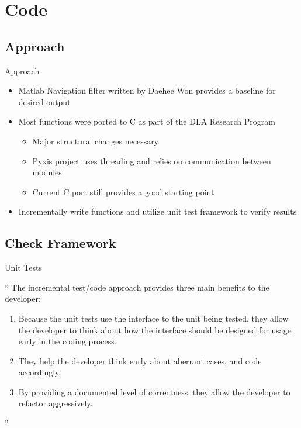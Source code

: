 \documentclass[10pt,aspectratio=169]{beamer}
\begin{document}
\section{Code}%

\subsection{Approach}
    \begin{frame}{Approach}
        \begin{itemize}
            \item Matlab Navigation filter written by Daehee Won provides a baseline for desired output
            \item Most functions were ported to C as part of the DLA Research Program
            \begin{itemize}
                \item Major structural changes necessary
                \item Pyxis project uses threading and relies on communication between modules
                \item Current C port still provides a good starting point
            \end{itemize}
            \item Incrementally write functions and utilize unit test framework to verify results
        \end{itemize}
    \end{frame}

\subsection{Check Framework}
    \begin{frame}{Unit Tests}
        \begin{block}{}
        {{\Huge``} The incremental test/code approach provides three main benefits to the developer:
            \begin{enumerate}
                    \item Because the unit tests use the interface to the unit being tested, they allow the developer to think about how the interface should be designed for usage early in the coding process.
                    \item They help the developer think early about aberrant cases, and code accordingly.
                    \item By providing a documented level of correctness, they allow the developer to refactor aggressively.
                \end{enumerate} {\Huge''}}\cite{check:2016}
        \vskip5mm
        \end{block}{}
    \end{frame}
\end{document}
